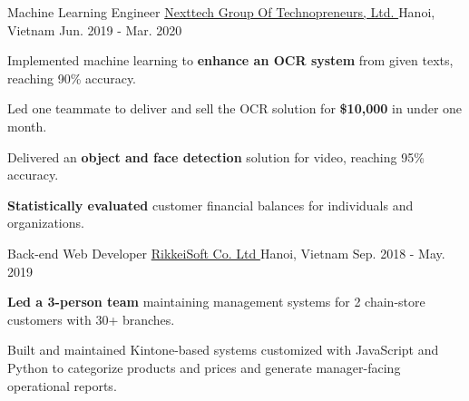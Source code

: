 \begin{cventries}
    \cventry
            {Machine Learning Engineer} %
            {\href{https://nexttech.asia/}{Nexttech Group Of Technopreneurs, Ltd. }} %
            {Hanoi, Vietnam} %
            {Jun. 2019 - Mar. 2020} %
            {
                \begin{cvitems}
                    \item Implemented machine learning to \textbf{enhance an OCR system} from given texts, reaching 90\% accuracy.
                    \item Led one teammate to deliver and sell the OCR solution for \textbf{\$10,000} in under one month.
                    \item Delivered an \textbf{object and face detection} solution for video, reaching 95\% accuracy.
                    \item \textbf{Statistically evaluated} customer financial balances for individuals and organizations.
                \end{cvitems}
            }
    \vspace{4mm}

    \cventry
        {Back-end Web Developer}
        {\href{https://rikkeisoft.com/en/}{RikkeiSoft Co. Ltd }}
        {Hanoi, Vietnam}
        {Sep. 2018 - May. 2019}
        {
            \begin{cvitems}
                \item \textbf{Led a 3-person team} maintaining management systems for 2 chain-store customers with 30+ branches.
                \item Built and maintained Kintone-based systems customized with JavaScript and Python to categorize products and prices and generate manager-facing operational reports.
            \end{cvitems}
        }
    \vspace{4mm}

\end{cventries}
